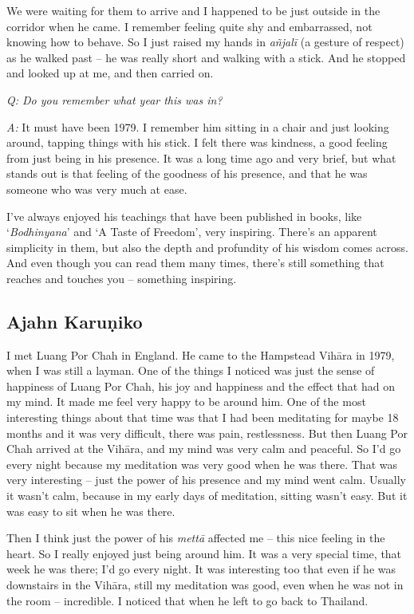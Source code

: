 We were waiting for them to arrive and I happened to be just outside in
the corridor when he came. I remember feeling quite shy and embarrassed,
not knowing how to behave. So I just raised my hands in \emph{añjalī} (a
gesture of respect) as he walked past -- he was really short and walking
with a stick. And he stopped and looked up at me, and then carried on.

\emph{Q: Do you remember what year this was in?}

\emph{A:} It must have been 1979. I remember him sitting in a chair and
just looking around, tapping things with his stick. I felt there was
kindness, a good feeling from just being in his presence. It was a long
time ago and very brief, but what stands out is that feeling of the
goodness of his presence, and that he was someone who was very much at
ease.

I've always enjoyed his teachings that have been published in books, 
like `\emph{Bodhinyana}' and `A Taste of Freedom', very inspiring.
There's an apparent simplicity in them, but also the depth and
profundity of his wisdom comes across. And even though you can read them
many times, there's still something that reaches and touches you --
something inspiring. 

\subsection{Ajahn Karuṇiko}

I met Luang Por Chah in England. He came to the Hampstead Vihāra in
1979, when I was still a layman. One of the things I noticed was just
the sense of happiness of Luang Por Chah, his joy and happiness and the
effect that had on my mind. It made me feel very happy to be around him. 
One of the most interesting things about that time was that I had been
meditating for maybe 18 months and it was very difficult, there
was pain, restlessness. But then Luang Por Chah arrived at the Vihāra, 
and my mind was very calm and peaceful. So I'd go every night because my
meditation was very good when he was there. That was very interesting --
just the power of his presence and my mind went calm. Usually it wasn't
calm, because in my early days of meditation, sitting wasn't easy. But
it was easy to sit when he was there.

Then I think just the power of his \emph{mettā} affected me -- this nice
feeling in the heart. So I really enjoyed just being around him. It was
a very special time, that week he was there; I'd go every night. It was
interesting too that even if he was downstairs in the Vihāra, still my
meditation was good, even when he was not in the room -- incredible. I
noticed that when he left to go back to Thailand. 

